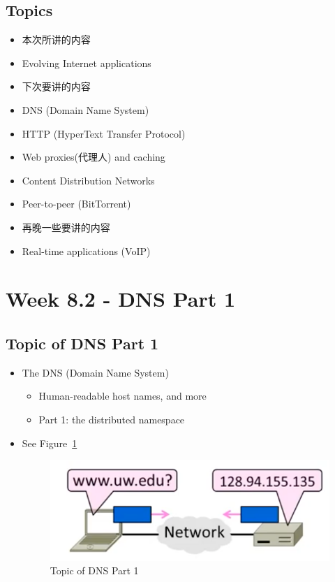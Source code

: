 \documentclass[12pt]{ctexart}   %
\begin{document}
	\subsection{Topics}
	\begin{itemize}
		\item {\color{red} 本次所讲的内容}
		\item Evolving Internet applications
		
		\item {\color{red} 下次要讲的内容}
		\item DNS (Domain Name System)
		\item HTTP (HyperText Transfer Protocol)
		\item Web proxies(代理人) and caching
		\item Content Distribution Networks
		\item Peer-to-peer (BitTorrent)
		
		\item {\color{red} 再晚一些要讲的内容}
		\item Real-time applications (VoIP)
	\end{itemize}
	
\section{Week 8.2 - DNS Part 1}	
	\subsection{Topic of DNS Part 1}
	\begin{itemize}
		\item The DNS (Domain Name System)
		\begin{itemize}
			\item Human-readable host names, and more
			\item Part 1: the distributed namespace
		\end{itemize}
		\item See Figure~\ref{fig:8-2-1}
		  
		 \begin{figure}[h!] %
		\centering
		 \includegraphics[scale=0.7]{images/8-2-1}
		\caption{ Topic of DNS Part 1 }
		 \label{fig:8-2-1}
		 \end{figure}
	\end{itemize}
	
\end{document}
